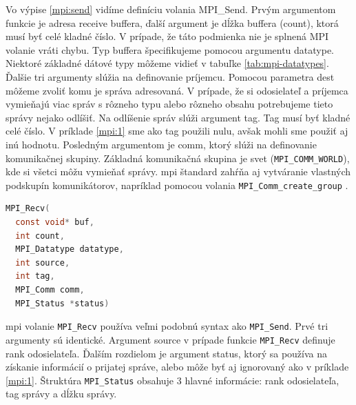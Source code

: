 Vo výpise \ref{mpi:send} vidíme definíciu volania MPI\_Send. Prvým argumentom funkcie je adresa receive buffera, ďalší argument je dĺžka buffera (count), ktorá musí byť celé kladné číslo.
V prípade, že táto podmienka nie je splnená MPI volanie vráti chybu. Typ buffera špecifikujeme pomocou argumentu datatype.
Niektoré základné dátové typy môžeme vidieť v tabuľke \ref{tab:mpi-datatypes}.
Ďalšie tri argumenty slúžia na definovanie príjemcu. Pomocou parametra dest môžeme zvoliť komu je správa adresovaná.
V prípade, že si odosielateľ a príjemca vymieňajú viac správ s rôzneho typu alebo rôzneho obsahu potrebujeme tieto správy nejako odlíšiť.
Na odlíšenie správ slúži argument tag. Tag musí byť kladné celé číslo. V príklade \ref{mpi:1} sme ako tag použili nulu,
avšak mohli sme použiť aj inú hodnotu. Posledným argumentom je comm, ktorý slúži na definovanie komunikačnej skupiny.
Základná komunikačná skupina je svet (\texttt{MPI\_COMM\_WORLD}), kde si všetci môžu vymieňať správy.
\acrshort{mpi} štandard zahŕňa aj vytváranie vlastných podskupín komunikátorov, napríklad pomocou volania \texttt{MPI\_Comm\_create\_group} \cite{mpi3-1}.

\begin{lstlisting}[language=c, caption={MPI\_Recv}, label={mpi:recv}]
  MPI_Recv(
  const void* buf,
  int count,
  MPI_Datatype datatype,
  int source,
  int tag,
  MPI_Comm comm,
  MPI_Status *status)
\end{lstlisting}

\acrshort{mpi} volanie \texttt{MPI\_Recv} používa veľmi podobnú syntax ako \texttt{MPI\_Send}. Prvé tri argumenty sú identické.
Argument source v prípade funkcie \texttt{MPI\_Recv} definuje rank odosielateľa. Ďalším rozdielom je argument status,
ktorý sa používa na získanie informácií o prijatej správe, alebo môže byť aj ignorovaný ako v príklade \ref{mpi:1}.
Štruktúra \texttt{MPI\_Status} obsahuje 3 hlavné informácie: rank odosielateľa, tag správy a dĺžku správy.

